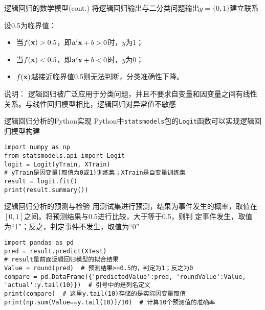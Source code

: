\documentclass[t]{beamer}
\begin{document}
\begin{frame}[fragile]{逻辑回归的数学模型(cont.)}
  将逻辑回归输出与二分类问题输出$y=\{0, 1\}$建立联系

  设0.5为临界值：
\begin{itemize}
  \item 当$f({\bf x})>0.5$，即${\bf a}'{\bf x}+b>0$时，$y$为1；
  \item 当$f({\bf x})<0.5$，即${\bf a}'{\bf x}+b<0$时，$y$为0；
  \item $f({\bf x})$越接近临界值0.5则无法判断，分类准确性下降。
\end{itemize}

\begin{block}{说明：}
  逻辑回归被广泛应用于分类问题，并且不要求自变量和因变量之间有线性关系。与线性回归模型相比，逻辑回归{\color{red}对异常值不敏感}
\end{block}
\end{frame}

\begin{frame}[fragile]{逻辑回归分析的Python实现}
Python中\verb|statsmodels|包的\verb|Logit|函数可以实现逻辑回归模型构建
\begin{lstlisting}
import numpy as np
from statsmodels.api import Logit
logit = Logit(yTrain, XTrain) 
# yTrain是因变量(取值为0或1)训练集；XTrain是自变量训练集
result = logit.fit()
print(result.summary())
\end{lstlisting}
\end{frame}

\begin{frame}[fragile]{逻辑回归分析的预测与检验}
用测试集进行预测，结果为事件发生的概率，取值在$[0,1]$之间。将预测结果与0.5进行比较，大于等于0.5，则判
定事件发生，取值为“1”；反之，判定事件不发生，取值为“0”
\begin{lstlisting}
import pandas as pd
pred = result.predict(XTest) 
# result是前面逻辑回归模型的拟合结果
Value = round(pred)  # 预测结果>=0.5的，判定为1；反之为0
compare = pd.DataFrame({'predictedValue':pred, 'roundValue':Value, 'actual':y.tail(10)})  # 引号中的是列名定义
print(compare)  # 这里y.tail(10)存储的是实际因变量取值
print(np.sum(Value==y.tail(10))/10)  # 计算10个预测值的准确率
\end{lstlisting}
\end{frame}
\end{document}
